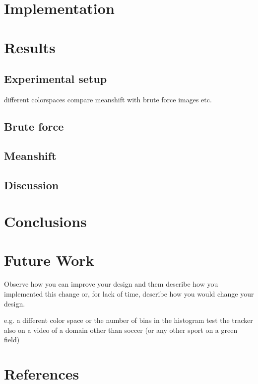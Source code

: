 \documentclass[a4paper,11pt]{article}
\begin{document}


\section{Implementation}

\section{Results} 
	\subsection{Experimental setup} 
	different colorspaces
	compare meanshift with brute force
	images etc.
	\subsection{Brute force} 
	\subsection{Meanshift} 
\subsection{Discussion} %


\section{Conclusions} \label{sec:conc}
\section{Future Work} \label{sec:fut}
Observe how you can improve your design and them describe how you implemented this change or, for lack of time, describe how you would change your design. 

e.g. a different color space or the number of bins in the histogram
test the tracker also on a video of a domain other than soccer (or any other sport on a green field)

\section{References} 


% 
% 
\end{document}
